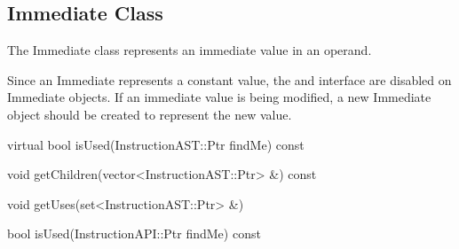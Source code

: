 \subsection{Immediate Class}
\label{sec:immediate}

The Immediate class represents an immediate value in an operand.

Since an Immediate represents a constant value, the  and
 interface are disabled on Immediate objects. If an immediate
value is being modified, a new Immediate object should be created to represent
the new value. 

\begin{apient}
virtual bool isUsed(InstructionAST::Ptr findMe) const
\end{apient}

\begin{apient}
void getChildren(vector<InstructionAST::Ptr> &) const
\end{apient}

\begin{apient}
void getUses(set<InstructionAST::Ptr> &)
\end{apient}

\begin{apient}
bool isUsed(InstructionAPI::Ptr findMe) const
\end{apient}

